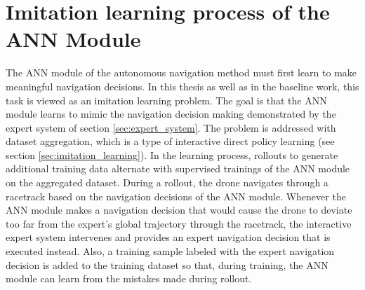 \section{Imitation learning process of the ANN Module} \label{sec:training}
The ANN module of the autonomous navigation method 
must first learn to make meaningful navigation decisions.
In this thesis as well as in the baseline work,
this task is viewed as an imitation learning problem.
The goal is that the ANN module learns to mimic
the navigation decision making demonstrated by the expert system
of section \ref{sec:expert_system}.
The problem is addressed with dataset aggregation,
which is a type of interactive direct policy learning
(see section \ref{sec:imitation_learning}).
In the learning process, 
rollouts to generate additional training data 
alternate with supervised trainings of the ANN module on the aggregated dataset.
During a rollout, the drone navigates through a racetrack
based on the navigation decisions of the ANN module.
Whenever the ANN module makes a navigation decision 
that would cause the drone to deviate too far from the
expert's global trajectory through the racetrack, 
the interactive expert system intervenes 
and provides an expert navigation decision that is executed instead.
Also, 
a training sample labeled with the expert navigation decision 
is added to the training dataset 
so that, during training, the ANN module can learn from the mistakes made
during rollout.


